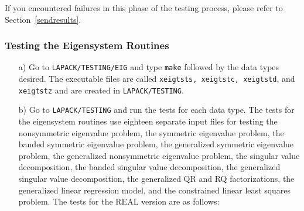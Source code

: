 \documentclass[11pt]{report}
\begin{document}
If you encountered failures in this phase of the testing process, please
refer to Section~\ref{sendresults}.

\subsubsection{Testing the Eigensystem Routines}\label{testeig}

\begin{itemize}

\item[a)]
Go to \texttt{LAPACK/TESTING/EIG} and type \texttt{make} followed by the data types
desired.  The executable files are called \texttt{xeigtsts,
xeigtstc, xeigtstd}, and \texttt{xeigtstz} and are created
in \texttt{LAPACK/TESTING}.

\item[b)]
Go to \texttt{LAPACK/TESTING} and run the tests for each data type.
The tests for the eigensystem routines use eighteen separate input files
for testing the nonsymmetric eigenvalue problem,
the symmetric eigenvalue problem, the banded symmetric eigenvalue
problem, the generalized symmetric eigenvalue
problem, the generalized nonsymmetric eigenvalue problem, the
singular value decomposition, the banded singular value decomposition,
the generalized singular value
decomposition, the generalized QR and RQ factorizations, the generalized
linear regression model, and the constrained linear least squares
problem.
The tests for the REAL version are as follows:
\end{itemize}
\end{document}
